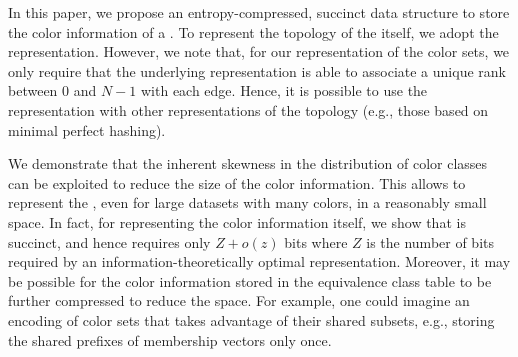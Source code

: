 In this paper, we propose an entropy-compressed, succinct data structure to
store the color information of a \cdbg. To represent the topology of the \dbg
itself, we adopt the \boss~\cite{BoweOn12} representation. However, we note
that, for our representation of the color sets, we only require that the
underlying \dbg representation is able to associate a unique rank between $0$
and $N-1$ with each edge. Hence, it is possible to use the \rainbowfish
representation with other representations of the \dbg topology (e.g., those
based on minimal perfect hashing).

We demonstrate that the inherent skewness in the distribution of color classes
can be exploited to reduce the size of the color information. This allows
\rainbowfish to represent the \cdbg, even for large datasets with many colors, in a
reasonably small space. In fact, for representing the color information itself,
we show that \rainbowfish is succinct, and hence requires only $Z + o(z)$ bits where
$Z$ is the number of bits required by an information-theoretically optimal
representation.
%
Moreover, it may be possible for the color information stored in the equivalence
class table to be further compressed to reduce the space. For example, one could
imagine an encoding of color sets that takes advantage of their shared subsets,
e.g., storing the shared prefixes of membership vectors only once.
%


